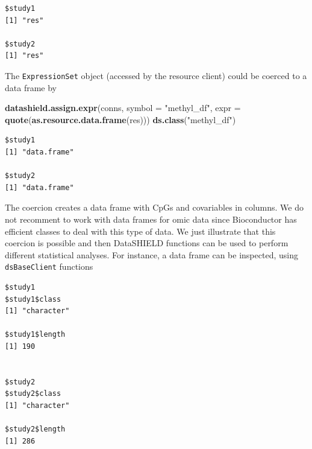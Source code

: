 \documentclass[]{article}
\newenvironment{Shaded}{\begin{snugshade}}{\end{snugshade}}
\newcommand{\DataTypeTok}[1]{\textcolor[rgb]{0.13,0.29,0.53}{#1}}
\newcommand{\KeywordTok}[1]{\textcolor[rgb]{0.13,0.29,0.53}{\textbf{#1}}}
\newcommand{\NormalTok}[1]{#1}
\newcommand{\StringTok}[1]{\textcolor[rgb]{0.31,0.60,0.02}{#1}}
\begin{document}
\begin{verbatim}
$study1
[1] "res"

$study2
[1] "res"
\end{verbatim}

The \texttt{ExpressionSet} object (accessed by the resource client)
could be coerced to a data frame by

\begin{Shaded}
\begin{Highlighting}[]
\KeywordTok{datashield.assign.expr}\NormalTok{(conns, }\DataTypeTok{symbol =} \StringTok{"methyl\_df"}\NormalTok{, }
                       \DataTypeTok{expr =} \KeywordTok{quote}\NormalTok{(}\KeywordTok{as.resource.data.frame}\NormalTok{(res)))}
\KeywordTok{ds.class}\NormalTok{(}\StringTok{"methyl\_df"}\NormalTok{)}
\end{Highlighting}
\end{Shaded}

\begin{verbatim}
$study1
[1] "data.frame"

$study2
[1] "data.frame"
\end{verbatim}

The coercion creates a data frame with CpGs and covariables in columns.
We do not recomment to work with data frames for omic data since
Bioconductor has efficient classes to deal with this type of data. We
just illustrate that this coercion is possible and then DataSHIELD
functions can be used to perform different statistical analyses. For
instance, a data frame can be inspected, using \texttt{dsBaseClient}
functions

\begin{Shaded}
\end{Shaded}

\begin{verbatim}
$study1
$study1$class
[1] "character"

$study1$length
[1] 190


$study2
$study2$class
[1] "character"

$study2$length
[1] 286
\end{verbatim}

\begin{Shaded}
\end{Shaded}
\end{document}
